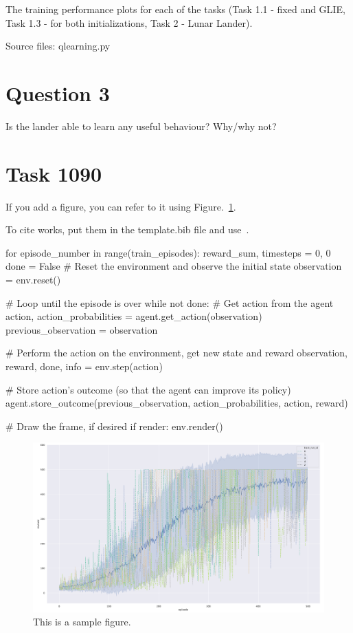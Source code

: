 \documentclass[12pt]{article}
\begin{document}
The training performance plots for each of the tasks (Task 1.1 - fixed and GLIE, Task
1.3 - for both initializations, Task 2 - Lunar Lander).
\newline

\noindent
Source files: qlearning.py

\section*{Question 3}

Is the lander able to learn any useful behaviour? Why/why not?


\pagebreak


\section{Task 1090}

If you add a figure, you can refer to it using Figure.~\ref*{fig:fig1}.

To cite works, put them in the template.bib file and use~\cite{sutton2018reinforcement}.

\begin{pycode}
for episode_number in range(train_episodes):
    reward_sum, timesteps = 0, 0
    done = False
    # Reset the environment and observe the initial state
    observation = env.reset()

    # Loop until the episode is over
    while not done:
        # Get action from the agent
        action, action_probabilities = agent.get_action(observation)
        previous_observation = observation

        # Perform the action on the environment, get new state and reward
        observation, reward, done, info = env.step(action)

        # Store action's outcome (so that the agent can improve its policy)
        agent.store_outcome(previous_observation, action_probabilities, action, reward)

        # Draw the frame, if desired
        if render:
            env.render()
\end{pycode}

\begin{figure}[h] 
	\centering  %
    \includegraphics[width=0.9\columnwidth]{img/training.pdf}
	\caption{This is a sample figure.}
	\label{fig:fig1}
\end{figure}


\end{document}
